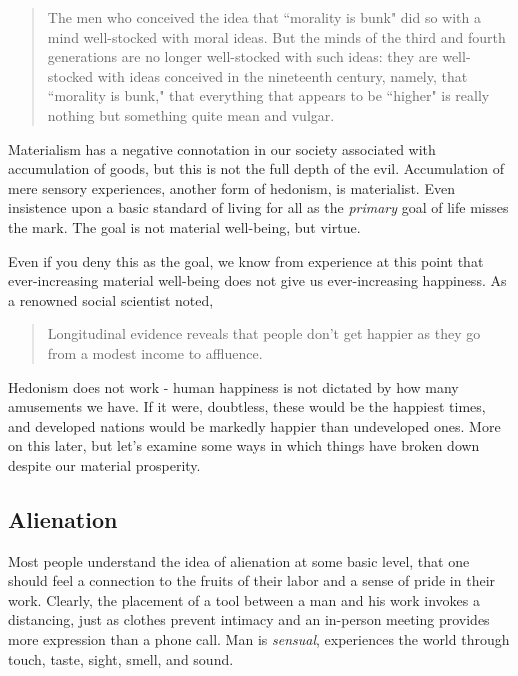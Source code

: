 \documentclass[letterpaper]{article}
\begin{document}
\begin{quote}
  The men who conceived the idea that ``morality is bunk" did so with a mind well-stocked with moral ideas. But the minds of the third and fourth generations are no longer well-stocked with such ideas: they are well-stocked with ideas conceived in the nineteenth century, namely, that ``morality is bunk," that everything that appears to be ``higher" is really nothing but something quite mean and vulgar.
\end{quote}

Materialism has a negative connotation in our society associated with accumulation of goods, but this is not the full depth of the evil. Accumulation of mere sensory experiences, another form of hedonism, is materialist. Even insistence upon a basic standard of living for all as the \textit{primary} goal of life misses the mark. The goal is not material well-being, but virtue.

Even if you deny this as the goal, we know from experience at this point that ever-increasing material well-being does not give us ever-increasing happiness. As a renowned social scientist noted,

\begin{quote}
  Longitudinal evidence reveals that people don't get happier as they go from a modest income to affluence.
\end{quote}

Hedonism does not work - human happiness is not dictated by how many amusements we have. If it were, doubtless, these would be the happiest times, and developed nations would be markedly happier than undeveloped ones. More on this later, but let's examine some ways in which things have broken down despite our material prosperity.

\subsection{Alienation}

Most people understand the idea of alienation at some basic level, that one should feel a connection to the fruits of their labor and a sense of pride in their work. Clearly, the placement of a tool between a man and his work invokes a distancing, just as clothes prevent intimacy and an in-person meeting provides more expression than a phone call. Man is \textit{sensual}, experiences the world through touch, taste, sight, smell, and sound.
\end{document}
